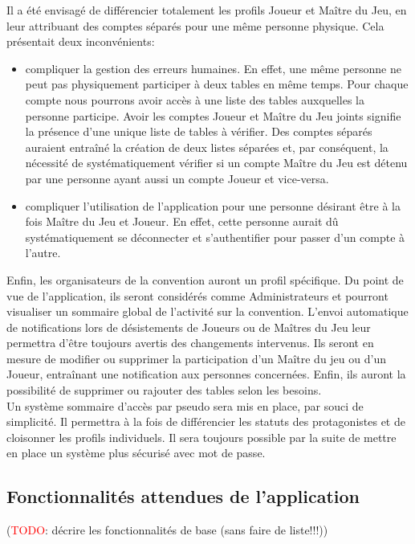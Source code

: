 \documentclass[11pt]{article}
\begin{document}
\indent Il a été envisagé de différencier totalement les profils Joueur et Maître du Jeu, en leur attribuant des comptes séparés pour une même personne physique. Cela présentait deux inconvénients:
\begin{itemize}
\item{compliquer la gestion des erreurs humaines. En effet, une même personne ne peut pas physiquement participer à deux tables en même temps. Pour chaque compte nous pourrons avoir accès à une liste des tables auxquelles la personne participe. Avoir les comptes Joueur et Maître du Jeu joints signifie la présence d'une unique liste de tables à vérifier. Des comptes séparés auraient entraîné la création de deux listes séparées et, par conséquent, la nécessité de systématiquement vérifier si un compte Maître du Jeu est détenu par une personne ayant aussi un compte Joueur et vice-versa.}
\item{compliquer l'utilisation de l'application pour une personne désirant être à la fois Maître du Jeu et Joueur. En effet, cette personne aurait dû systématiquement se déconnecter et s'authentifier pour passer d'un compte à l'autre.\\}
\end{itemize}

Enfin, les organisateurs de la convention auront un profil spécifique. Du point de vue de l'application, ils seront considérés comme Administrateurs et pourront visualiser un sommaire global de l'activité sur la convention. L'envoi automatique de notifications lors de désistements de Joueurs ou de Maîtres du Jeu leur permettra d'être toujours avertis des changements intervenus. Ils seront en mesure de modifier ou supprimer la participation d'un Maître du jeu ou d'un Joueur, entraînant une notification aux personnes concernées. Enfin, ils auront la possibilité de supprimer ou rajouter des tables selon les besoins.\\

Un système sommaire d'accès par pseudo sera mis en place, par souci de simplicité. Il permettra à la fois de différencier les statuts des protagonistes et de cloisonner les profils individuels. Il sera toujours possible par la suite de mettre en place un système plus sécurisé avec mot de passe. \\

\subsection{Fonctionnalités attendues de l'application}
(\textcolor{red}{TODO}: décrire les fonctionnalités de base (sans faire de liste!!!))
\end{document}
